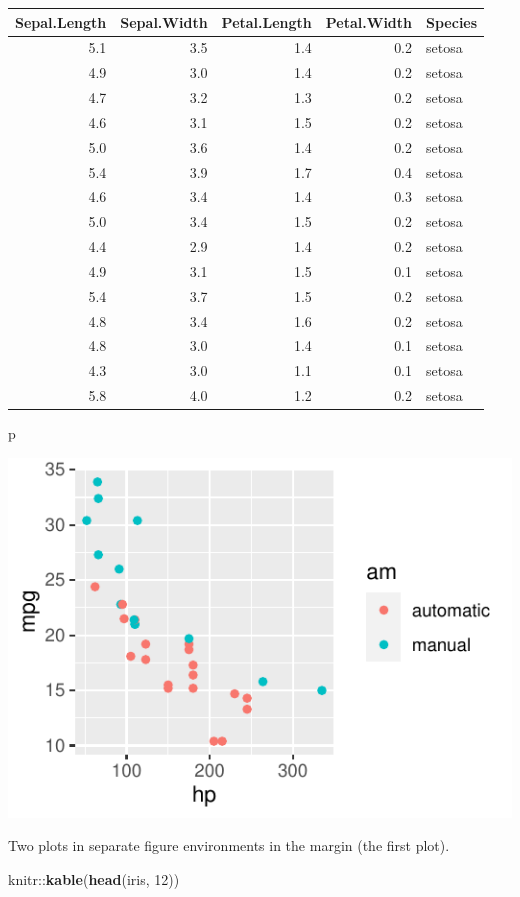 \documentclass[]{tufte-book}
\newenvironment{Shaded}{}{}
\newcommand{\DecValTok}[1]{\textcolor[rgb]{0.25,0.63,0.44}{#1}}
\newcommand{\KeywordTok}[1]{\textcolor[rgb]{0.00,0.44,0.13}{\textbf{#1}}}
\newcommand{\NormalTok}[1]{#1}
\newcommand{\OperatorTok}[1]{\textcolor[rgb]{0.40,0.40,0.40}{#1}}
\begin{document}
\begin{longtable}[]{@{}rrrrl@{}}
\toprule
Sepal.Length & Sepal.Width & Petal.Length & Petal.Width &
Species\tabularnewline
\midrule
\endhead
5.1 & 3.5 & 1.4 & 0.2 & setosa\tabularnewline
4.9 & 3.0 & 1.4 & 0.2 & setosa\tabularnewline
4.7 & 3.2 & 1.3 & 0.2 & setosa\tabularnewline
4.6 & 3.1 & 1.5 & 0.2 & setosa\tabularnewline
5.0 & 3.6 & 1.4 & 0.2 & setosa\tabularnewline
5.4 & 3.9 & 1.7 & 0.4 & setosa\tabularnewline
4.6 & 3.4 & 1.4 & 0.3 & setosa\tabularnewline
5.0 & 3.4 & 1.5 & 0.2 & setosa\tabularnewline
4.4 & 2.9 & 1.4 & 0.2 & setosa\tabularnewline
4.9 & 3.1 & 1.5 & 0.1 & setosa\tabularnewline
5.4 & 3.7 & 1.5 & 0.2 & setosa\tabularnewline
4.8 & 3.4 & 1.6 & 0.2 & setosa\tabularnewline
4.8 & 3.0 & 1.4 & 0.1 & setosa\tabularnewline
4.3 & 3.0 & 1.1 & 0.1 & setosa\tabularnewline
5.8 & 4.0 & 1.2 & 0.2 & setosa\tabularnewline
\bottomrule
\end{longtable}

\begin{Shaded}
\begin{Highlighting}[]
\NormalTok{p}
\end{Highlighting}
\end{Shaded}

\begin{marginfigure}
\includegraphics{deleteme_files/figure-latex/fig-margin-separate-1} \caption[Two plots in separate figure environments in the margin (the first plot)]{Two plots in separate figure environments in the margin (the first plot).}\label{fig:fig-margin-separate-1}
\end{marginfigure}

\begin{Shaded}
\begin{Highlighting}[]
\NormalTok{knitr}\OperatorTok{::}\KeywordTok{kable}\NormalTok{(}\KeywordTok{head}\NormalTok{(iris, }\DecValTok{12}\NormalTok{))}
\end{Highlighting}
\end{Shaded}
\end{document}
